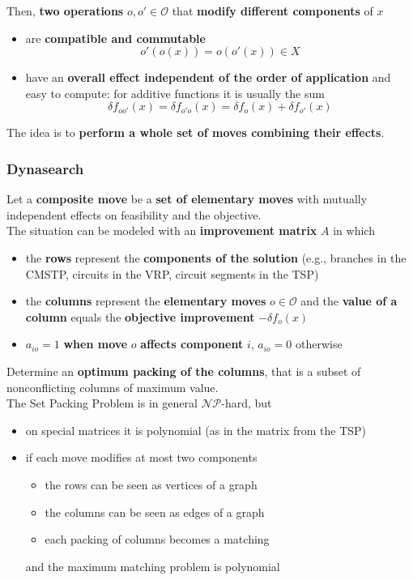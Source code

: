 \documentclass[11pt]{article}
\begin{document}
	Then, \textbf{two operations} $o, o' \in \mathcal{O}$ that \textbf{modify different components} of $x$ 
	\begin{itemize}
		\item are \textbf{compatible and commutable}
		$$ o' (o (x)) = o (o' (x)) \in X $$
		
		\item have an \textbf{overall effect independent of the order of application} and easy to compute: for additive functions it is usually the sum
		$$ \delta f_{oo'} (x) = \delta f_{o'o} (x) = \delta f_o (x) + \delta f_{o'} (x) $$
	\end{itemize}
	
	The idea is to \textbf{perform a whole set of moves combining their effects}.\\
	
	\newpage
	
	\subsubsection{Dynasearch}
	
	Let a \textbf{composite move} be a \textbf{set of elementary moves} with mutually independent effects on feasibility and the objective.\\
	
	The situation can be modeled with an \textbf{improvement matrix} $A$ in which 
	\begin{itemize}
		\item the \textbf{rows} represent the \textbf{components of the solution} (e.g., branches in the CMSTP, circuits in the VRP, circuit segments in the TSP)
		
		\item the \textbf{columns} represent the \textbf{elementary moves} $o \in \mathcal{O}$ and the \textbf{value of a column} equals the \textbf{objective improvement} $- \delta f_o (x)$
		
		\item $a_{io} = 1$ \textbf{when move} $o$ \textbf{affects component} $i$, $a_{io} = 0$ otherwise
	\end{itemize}
	
	Determine an \textbf{optimum packing of the columns}, that is a subset of nonconflicting columns of maximum value.\\
	
	The Set Packing Problem is in general $\mathcal{NP}$-hard, but
	\begin{itemize}
		\item on special matrices it is polynomial (as in the matrix from the TSP)
		
		\item if each move modifies at most two components
		\begin{itemize}
			\item the rows can be seen as vertices of a graph
			\item the columns can be seen as edges of a graph
			\item each packing of columns becomes a matching
		\end{itemize}
		and the maximum matching problem is polynomial
	\end{itemize}
	
\end{document}
